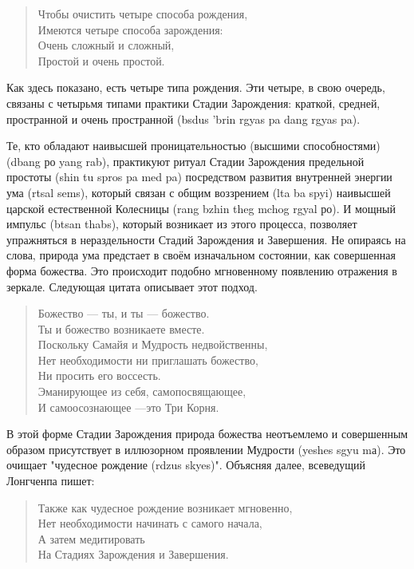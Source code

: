 \begin{verse}
Чтобы очистить четыре способа рождения,\\
Имеются четыре способа зарождения:\\
Очень сложный и сложный,\\
Простой и очень простой.
\end{verse}

\begin{siderules}
Как здесь показано, есть четыре типа рождения. Эти четыре, в свою очередь, связаны с
четырьмя типами практики Стадии Зарождения: краткой, средней, простран\-ной и очень
пространной (bsdus 'brin rgyas pa dang rgyas pa).
\end{siderules}

\newpage
{}
\Vspace{1cm}
Те, кто обладают наивысшей проницательностью (высшими способностями) (dbang ро
yang rab), практикуют ритуал Стадии Зарождения предельной простоты (shin tu spros pa med
pa) посредством развития внутренней энергии ума (rtsal sems), который связан с общим
воззрением (lta ba spyi) наивысшей царской естественной Колесницы (rang bzhin theg mchog
rgyal ро). И мощный импульс (btsan thabs), который возникает из этого процесса, позволяет
упражняться в нераздельности Стадий Зарождения и Завершения. Не опираясь на слова,
природа ума предстает в своём изначальном состоянии, как совершенная форма божества.
Это происходит подобно мгнове\-нному появлению отражения в зеркале. Следующая цитата
описывает этот подход.

\begin{verse}
Божество — ты, и ты — божество.\\
Ты и божество возникаете вместе.\\
Поскольку Самайя и Мудрость недвойственны,\\
Нет необходимости ни приглашать божество,\\
Ни просить его воссесть.\\
Эманирующее из себя, самопосвящающее,\\
И самоосознающее —это Три Корня.\\
\end{verse}

В этой форме Стадии Зарождения природа божества неотъем\-лемо и совершенным
образом присутствует в иллюзорном проявлении Мудрости (yeshes sgyu mа).
Это очищает "чудесное рождение (rdzus skyes)". Объясняя далее, всеведущий Лонгчен\-па пишет:

\begin{verse}
Также как чудесное рождение возникает мгновенно,\\
Нет необходимости начинать с самого начала,\\
А затем медитировать\\
На Стадиях Зарождения и Завершения.\\
\end{verse}

